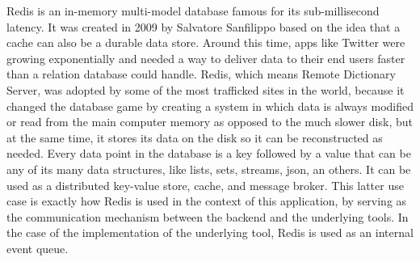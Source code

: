 Redis is an in-memory multi-model database famous for its sub-millisecond latency.
It was created in 2009 by Salvatore Sanfilippo based on the idea that a cache can also be a durable data store. Around this time, apps like Twitter were growing exponentially and needed a way to deliver data to their end users faster than a relation database could handle.
Redis, which means Remote Dictionary Server, was adopted by some of the most trafficked sites in the world, because it changed the database game by creating a system in which data is always modified or read from the main computer memory as opposed to the much slower disk, but at the same time, it stores its data on the disk so it can be reconstructed as needed.
Every data point in the database is a key followed by a value that can be any of its many data structures, like lists, sets, streams, json, an others. It can be used as a distributed key-value store, cache, and message broker. This latter use case is exactly how Redis is used in the context of this application, by serving as the communication mechanism between the backend and the underlying tools. In the case of the implementation of the underlying tool, Redis is used as an internal event queue.
